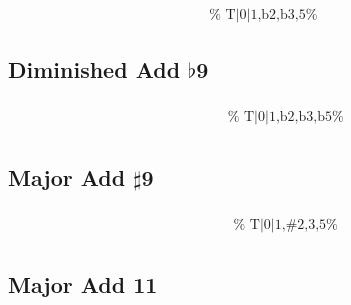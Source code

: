 \documentclass[english]{./gbook}
\begin{document}
\begin{large}
\[\begin{array}{ll}
&
	\text{
	}
\end{array}
\]


\subsection*{Diminished Add $\flat$9}

\[
\begin{array}{ll}
	\begin{array}{c}
		\begin{array}{ccc}
			&%
			&%
		\end{array}
		\\
		\begin{array}{cc}
			&%
		\end{array}
	\end{array}

&
	\text{
	}
\end{array}
\]

\subsection*{Major Add $\sharp$9}

\[
\begin{array}{ll}
	\begin{array}{c}
		\begin{array}{ccc}
			&%
			&%
		\end{array}
		\\
		\begin{array}{cc}
			&%
		\end{array}
	\end{array}

&
	\text{
	}
\end{array}
\]

\subsection*{Major Add 11}

\[
\begin{array}{ll}
	\begin{array}{c}
		\begin{array}{ccc}
			&%
			&%
		\end{array}
		\\
		\begin{array}{cc}
			&%
		\end{array}
	\end{array}


\end{array}\]
\end{large}
\end{document}
